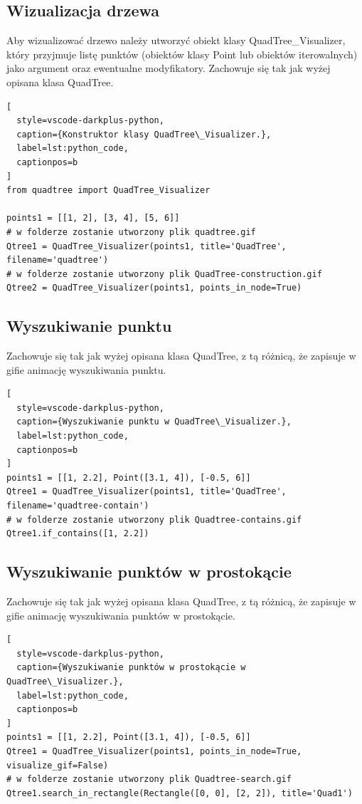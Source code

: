 \documentclass{lab}
\begin{document}
\subsection{Wizualizacja drzewa}
Aby wizualizować drzewo należy utworzyć obiekt klasy QuadTree\_Visualizer, który przyjmuje listę punktów (obiektów klasy Point lub obiektów iterowalnych) jako argument oraz ewentualne modyfikatory. Zachowuje się tak jak wyżej opisana klasa QuadTree.
\begin{lstlisting}[
  style=vscode-darkplus-python,
  caption={Konstruktor klasy QuadTree\_Visualizer.},
  label=lst:python_code,
  captionpos=b
]
from quadtree import QuadTree_Visualizer

points1 = [[1, 2], [3, 4], [5, 6]]
# w folderze zostanie utworzony plik quadtree.gif
Qtree1 = QuadTree_Visualizer(points1, title='QuadTree', filename='quadtree')
# w folderze zostanie utworzony plik QuadTree-construction.gif
Qtree2 = QuadTree_Visualizer(points1, points_in_node=True)
\end{lstlisting}

\subsection{Wyszukiwanie punktu}
Zachowuje się tak jak wyżej opisana klasa QuadTree, z tą różnicą, że zapisuje w gifie animację wyszukiwania punktu.
\begin{lstlisting}[
  style=vscode-darkplus-python,
  caption={Wyszukiwanie punktu w QuadTree\_Visualizer.},
  label=lst:python_code,
  captionpos=b
]
points1 = [[1, 2.2], Point([3.1, 4]), [-0.5, 6]]
Qtree1 = QuadTree_Visualizer(points1, title='QuadTree', filename='quadtree-contain')
# w folderze zostanie utworzony plik Quadtree-contains.gif
Qtree1.if_contains([1, 2.2])
\end{lstlisting}

\subsection{Wyszukiwanie punktów w prostokącie}
Zachowuje się tak jak wyżej opisana klasa QuadTree, z tą różnicą, że zapisuje w gifie animację wyszukiwania punktów w prostokącie.
\begin{lstlisting}[
  style=vscode-darkplus-python,
  caption={Wyszukiwanie punktów w prostokącie w QuadTree\_Visualizer.},
  label=lst:python_code,
  captionpos=b
]
points1 = [[1, 2.2], Point([3.1, 4]), [-0.5, 6]]
Qtree1 = QuadTree_Visualizer(points1, points_in_node=True, visualize_gif=False)
# w folderze zostanie utworzony plik Quadtree-search.gif
Qtree1.search_in_rectangle(Rectangle([0, 0], [2, 2]), title='Quad1')
\end{lstlisting}
\end{document}
